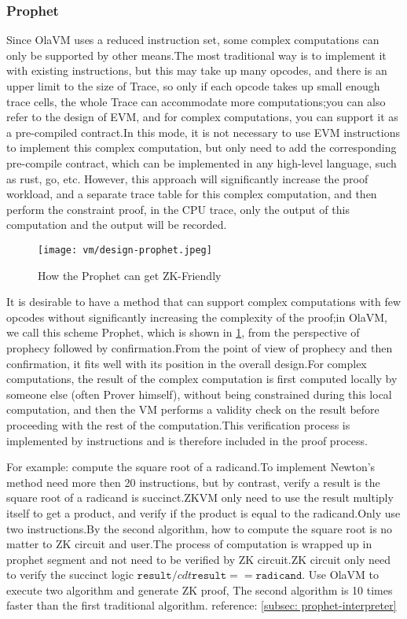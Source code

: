 \subsubsection{Prophet} \label{sec:design-prophet}

Since OlaVM uses a reduced instruction set, some complex computations can only be supported by other means.The most
traditional way is to implement it with existing instructions, but this may take up many opcodes, and there is an upper
limit to the size of Trace, so only if each opcode takes up small enough trace cells, the whole Trace can accommodate more
computations;you can also refer to the design of EVM, and for complex computations, you can support it as a pre-compiled
contract.In this mode, it is not necessary to use EVM instructions to implement this complex computation, but only need
to add the corresponding pre-compile contract, which can be implemented in any high-level language, such as rust, go, etc.
However, this approach will significantly increase the proof workload, and a separate trace table for this complex computation,
and then perform the constraint proof, in the CPU trace, only the output of this computation and the output will be recorded.

\begin{figure}[!ht]
    \centering
    \texttt{[image: vm/design-prophet.jpeg]}
    \caption{How the Prophet can get ZK-Friendly}
    \label{fig:design-prophet}
\end{figure}

It is desirable to have a method that can support complex computations with few opcodes without significantly increasing the
complexity of the proof;in OlaVM, we call this scheme Prophet, which is shown in \ref{fig:design-prophet}, from the perspective
of prophecy followed by confirmation.From the point of view of prophecy and then confirmation, it fits well with its position
in the overall design.For complex computations, the result of the complex computation is first computed locally by someone else
(often Prover himself), without being constrained during this local computation, and then the VM performs a validity check on the
result before proceeding with the rest of the computation.This verification process is implemented by instructions and is therefore
included in the proof process.

For example: compute the square root of a radicand.To implement Newton's method need more then 20 instructions, but by contrast,
verify a result is the square root of a radicand is succinct.ZKVM only need to use the result multiply itself to get a product, 
and verify if the product is equal to the radicand.Only use two instructions.By the second algorithm, how to compute the square
root is no matter to ZK circuit and user.The process of computation is wrapped up in prophet segment and not need to be verified
by ZK circuit.ZK circuit only need to verify the succinct logic $\texttt{result} /cdt \texttt{result} == \texttt{radicand}$.
Use OlaVM to execute two algorithm and generate ZK proof, The second algorithm is 10 times faster than the first traditional algorithm.
reference: \ref{subsec: prophet-interpreter}

